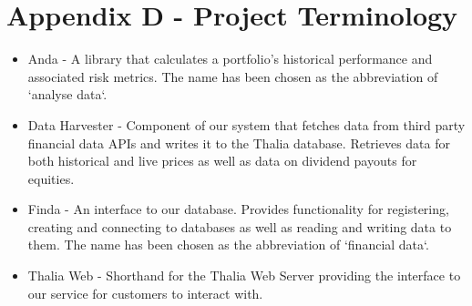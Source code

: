 \documentclass[main.tex]{subfiles}
\begin{document}
\section{Appendix D - Project Terminology}
\label{project_glossary}
\begin{itemize}
    \item Anda - A library that calculates a portfolio's historical performance and associated risk metrics. The name has been chosen as the abbreviation of `analyse data`.
    \item Data Harvester - Component of our system that fetches data from third party financial data APIs and writes it to the Thalia database. Retrieves data for both historical and live prices as well as data on dividend payouts for equities.
    \item Finda - An interface to our database. Provides functionality for registering, creating and connecting to databases as well as reading and writing data to them. The name has been chosen as the abbreviation of `financial data`.
    \item Thalia Web - Shorthand for the Thalia Web Server providing the interface to our service for customers to interact with.
\end{itemize}
\end{document}
